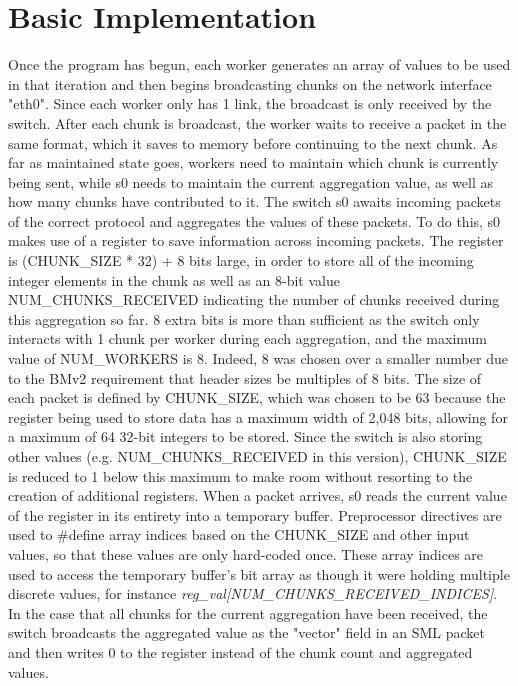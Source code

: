\documentclass[a4paper,11pt]{article}
\begin{document}
\section{Basic Implementation}
Once the program has begun, each worker generates an array of values to be used in that iteration and then begins broadcasting chunks on the network interface "eth0". Since each worker only has 1 link, the broadcast is only received by the switch. After each chunk is broadcast, the worker waits to receive a packet in the same format, which it saves to memory before continuing to the next chunk.\newline
As far as maintained state goes, workers need to maintain which chunk is currently being sent, while s0 needs to maintain the current aggregation value, as well as how many chunks have contributed to it.\newline
The switch s0 awaits incoming packets of the correct protocol and aggregates the values of these packets. To do this, s0 makes use of a register to save information across incoming packets. The register is (CHUNK\_SIZE * 32) + 8 bits large, in order to store all of the incoming integer elements in the chunk as well as an 8-bit value NUM\_CHUNKS\_RECEIVED indicating the number of chunks received during this aggregation so far. 8 extra bits is more than sufficient as the switch only interacts with 1 chunk per worker during each aggregation, and the maximum value of NUM\_WORKERS is 8. Indeed, 8 was chosen over a smaller number due to the BMv2 requirement that header sizes be multiples of 8 bits.\newline
The size of each packet is defined by CHUNK\_SIZE, which was chosen to be 63 because the register being used to store data has a maximum width of 2,048 bits, allowing for a maximum of 64 32-bit integers to be stored. Since the switch is also storing other values (e.g. NUM\_CHUNKS\_RECEIVED in this version), CHUNK\_SIZE is reduced to 1 below this maximum to make room without resorting to the creation of additional registers.\newline
When a packet arrives, s0 reads the current value of the register in its entirety into a temporary buffer. Preprocessor directives are used to \#define array indices based on the CHUNK\_SIZE and other input values, so that these values are only hard-coded once. These array indices are used to access the temporary buffer's bit array as though it were holding multiple discrete values, for instance \textit{reg\_val[NUM\_CHUNKS\_RECEIVED\_INDICES]}. In the case that all chunks for the current aggregation have been received, the switch broadcasts the aggregated value as the "vector" field in an SML packet and then writes 0 to the register instead of the chunk count and aggregated values.\newline
\end{document}
